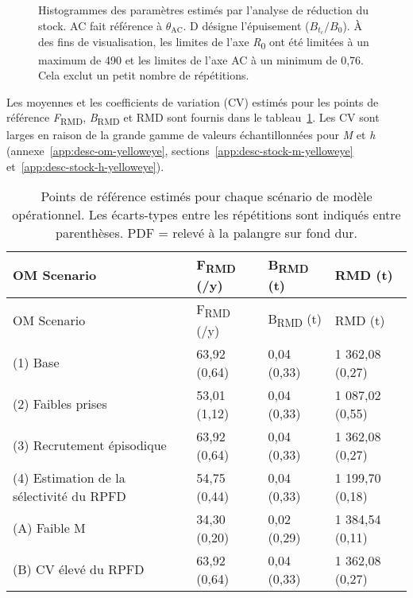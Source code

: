 \documentclass[french,11pt]{book}
\begin{document}
\begin{figure}[htb]

{\centering {} 

}

\caption{Histogrammes des paramètres estimés par l'analyse de réduction du stock. AC fait référence à \(\theta_\textrm{AC}\). D désigne l'épuisement (\(B_{t_c}/B_0\)). À des fins de visualisation, les limites de l'axe \emph{R}\textsubscript{0} ont été limitées à un maximum de 490 et les limites de l'axe AC à un minimum de 0,76. Cela exclut un petit nombre de répétitions.}\label{fig:sra-conditioned-parameters}
\end{figure}
Les moyennes et les coefficients de variation (CV) estimés pour les points de référence \emph{F}\textsubscript{RMD}, \emph{B}\textsubscript{RMD} et RMD sont fournis dans le tableau~\ref{tab:sra-ref-pts}. Les CV sont larges en raison de la grande gamme de valeurs échantillonnées pour \emph{M} et \emph{h} (annexe~\ref{app:desc-om-yelloweye}, sections~\ref{app:desc-stock-m-yelloweye} et~\ref{app:desc-stock-h-yelloweye}).
\begin{longtable}[]{@{}llll@{}}
\caption{\label{tab:sra-ref-pts}Points de référence estimés pour chaque scénario de modèle opérationnel. Les écarts-types entre les répétitions sont indiqués entre parenthèses. PDF = relevé à la palangre sur fond dur.}\tabularnewline
\toprule
OM Scenario & F\textsubscript{RMD} (/y) & B\textsubscript{RMD} (t) & RMD (t) \\
\midrule
\endfirsthead
\toprule
OM Scenario & F\textsubscript{RMD} (/y) & B\textsubscript{RMD} (t) & RMD (t) \\
\midrule
\endhead
(1) Base & 63,92 (0,64) & 0,04 (0,33) & 1 362,08 (0,27) \\
(2) Faibles prises & 53,01 (1,12) & 0,04 (0,33) & 1 087,02 (0,55) \\
(3) Recrutement épisodique & 63,92 (0,64) & 0,04 (0,33) & 1 362,08 (0,27) \\
(4) Estimation de la sélectivité du RPFD & 54,75 (0,44) & 0,04 (0,33) & 1 199,70 (0,18) \\
(A) Faible M & 34,30 (0,20) & 0,02 (0,29) & 1 384,54 (0,11) \\
(B) CV élevé du RPFD & 63,92 (0,64) & 0,04 (0,33) & 1 362,08 (0,27) \\
\bottomrule
\end{longtable}
\clearpage
\end{document}
